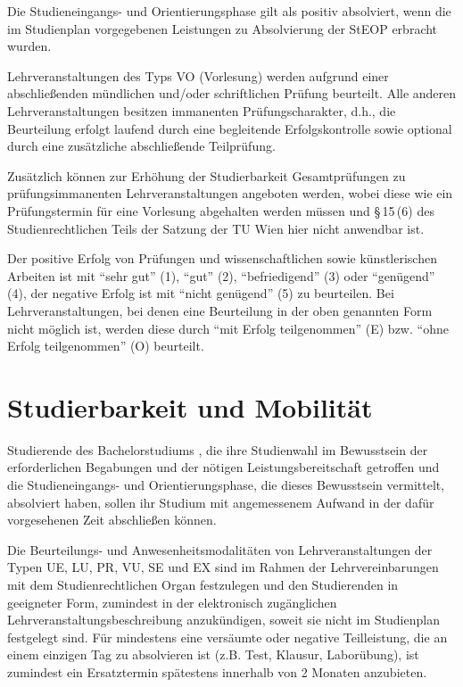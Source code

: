 Die Studieneingangs- und Orientierungsphase gilt als positiv
absolviert, wenn die im Studienplan vorgegebenen Leistungen zu
Absolvierung der StEOP erbracht wurden.

Lehrveranstaltungen des Typs VO (Vorlesung) werden aufgrund einer
abschließenden mündlichen und/oder schriftlichen Prüfung
beurteilt. Alle anderen Lehrveranstaltungen besitzen immanenten
Prüfungscharakter, d.h., die Beurteilung erfolgt laufend durch eine
begleitende Erfolgskontrolle sowie optional durch eine zusätzliche
abschließende Teilprüfung.

Zusätzlich können zur Erhöhung der Studierbarkeit Gesamtprüfungen zu
prüfungsimmanenten Lehrveranstaltungen angeboten werden, wobei diese
wie ein Prüfungstermin für eine Vorlesung abgehalten werden müssen und
§\,15\,(6) des Studienrechtlichen Teils der Satzung der TU Wien hier
nicht anwendbar ist.

Der positive Erfolg von Prüfungen und wissenschaftlichen sowie
künstlerischen Arbeiten ist mit "`sehr gut"' (1), "`gut"'
(2), "`befriedigend"' (3) oder "`genügend"' (4), der negative Erfolg
ist mit "`nicht genügend"' (5) zu beurteilen. Bei Lehrveranstaltungen,
bei denen eine Beurteilung in der oben genannten Form nicht möglich ist,
werden diese durch "`mit Erfolg teilgenommen"' (E) bzw.
"`ohne Erfolg teilgenommen"' (O) beurteilt.

%

\section{Studierbarkeit und Mobilität}\label{sec:SM}

Studierende des Bachelorstudiums \emph{}, die ihre
Studienwahl im Bewusstsein der erforderlichen Begabungen und der
nötigen Leistungsbereitschaft getroffen und die Studieneingangs- und
Orientierungsphase, die dieses Bewusstsein vermittelt, absolviert
haben, sollen ihr Studium mit angemessenem Aufwand in der dafür
vorgesehenen Zeit abschließen können.

%

Die Beurteilungs- und Anwesenheitsmodalitäten von Lehrveranstaltungen
der Typen UE, LU, PR, VU, SE und EX sind im Rahmen der
Lehrvereinbarungen mit dem Studienrechtlichen Organ festzulegen und
den Studierenden in geeigneter Form, zumindest in der elektronisch
zugänglichen Lehrveranstaltungsbeschreibung anzukündigen, soweit sie
nicht im Studienplan festgelegt sind. Für mindestens eine versäumte
oder negative Teilleistung, die an einem einzigen Tag zu absolvieren
ist (z.B. Test, Klausur, Laborübung), ist zumindest ein Ersatztermin
spätestens innerhalb von 2 Monaten anzubieten.

